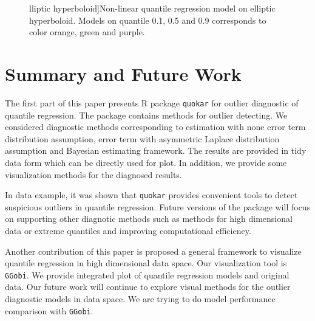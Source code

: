 \documentclass[article]{jss}
\theoremstyle{definition}
\theoremstyle{definition}
\theoremstyle{remark}
\begin{document}
\begin{CodeChunk}
\begin{figure}
lliptic hyperboloid]{Non-linear quantile regression model on elliptic hyperboloid. Models on quantile 0.1, 0.5 and 0.9 corresponds to color orange, green and purple.}\label{fig:fig-name3}
\end{figure}
\end{CodeChunk}

\section{Summary and Future Work}\label{summary-and-future-work}

The first part of this paper presents R package \texttt{quokar} for
outlier diagnostic of quantile regression. The package contains methods
for outlier detecting. We considered diagnostic methods corresponding to
estimation with none error term distribution assumption, error term with
asymmetric Laplace distribution assumption and Bayesian estimating
framework. The results are provided in tidy data form which can be
directly used for plot. In addition, we provide some visualization
methods for the diagnosed results.

In data example, it was shown that \texttt{quokar} provides convenient
tools to detect suspicious outliers in quantile regression. Future
versions of the package will focus on supporting other diagnotic methods
such as methods for high dimensional data or extreme quantiles and
improving computational efficiency.

Another contribution of this paper is proposed a general framework to
visualize quantile regression in high dimensional data space. Our
visualization tool is \texttt{GGobi}. We provide integrated plot of
quantile regression models and original data. Our future work will
continue to explore visual methods for the outlier diagnostic models in
data space. We are trying to do model performance comparison with
\texttt{GGobi}.


\end{document}
